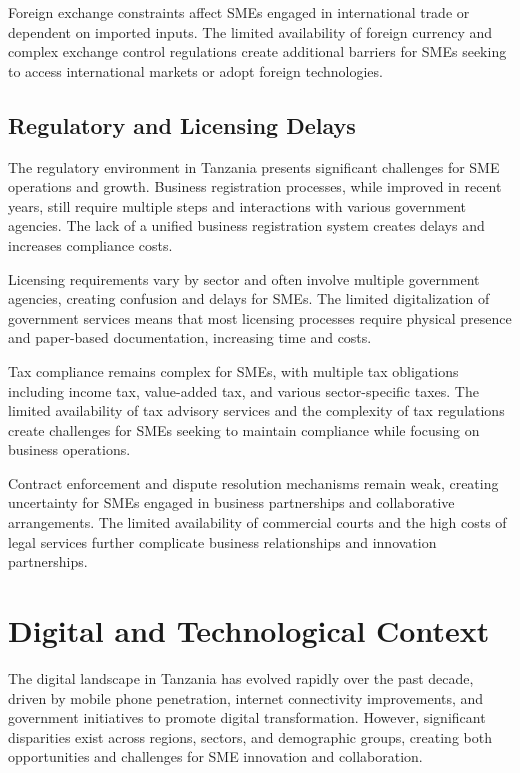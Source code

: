 \documentclass[12pt,a4paper]{article}
\begin{document}
Foreign exchange constraints affect SMEs engaged in international trade or dependent on imported inputs. The limited availability of foreign currency and complex exchange control regulations create additional barriers for SMEs seeking to access international markets or adopt foreign technologies.

\subsection{Regulatory and Licensing Delays}

The regulatory environment in Tanzania presents significant challenges for SME operations and growth. Business registration processes, while improved in recent years, still require multiple steps and interactions with various government agencies. The lack of a unified business registration system creates delays and increases compliance costs.

Licensing requirements vary by sector and often involve multiple government agencies, creating confusion and delays for SMEs. The limited digitalization of government services means that most licensing processes require physical presence and paper-based documentation, increasing time and costs.

Tax compliance remains complex for SMEs, with multiple tax obligations including income tax, value-added tax, and various sector-specific taxes. The limited availability of tax advisory services and the complexity of tax regulations create challenges for SMEs seeking to maintain compliance while focusing on business operations.

Contract enforcement and dispute resolution mechanisms remain weak, creating uncertainty for SMEs engaged in business partnerships and collaborative arrangements. The limited availability of commercial courts and the high costs of legal services further complicate business relationships and innovation partnerships.

\section{Digital and Technological Context}

The digital landscape in Tanzania has evolved rapidly over the past decade, driven by mobile phone penetration, internet connectivity improvements, and government initiatives to promote digital transformation. However, significant disparities exist across regions, sectors, and demographic groups, creating both opportunities and challenges for SME innovation and collaboration.
\end{document}
